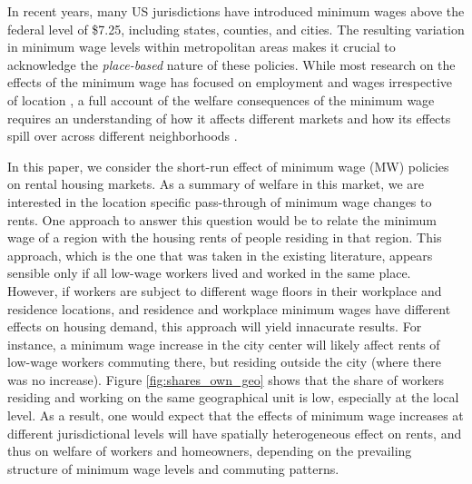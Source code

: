 

In recent years, many US jurisdictions have introduced minimum wages above the 
federal level of \$7.25, including states, counties, and cities.
The resulting variation in minimum wage levels within metropolitan areas makes it 
crucial to acknowledge the \textit{place-based} nature of these policies.
While most research on the effects of the minimum wage has focused on employment 
and wages irrespective of location \parencite[e.g.,][]{AutorEtAl2016,CegnizEtAl2019}, 
a full account of the welfare consequences of the minimum wage requires an 
understanding of how it affects different markets and how its effects spill over 
across different neighborhoods \parencite[as recently emphasized by][]{DubeLindner2021}.

In this paper, we consider the short-run effect of minimum wage (MW) policies on 
rental housing markets.
As a summary of welfare in this market, we are interested in the location specific
pass-through of minimum wage changes to rents.
One approach to answer this question would be to relate the minimum wage of a region
with the housing rents of people residing in that region.
This approach, which is the one that was taken in the existing literature, appears 
sensible only if all low-wage workers lived and worked in the same place.
However, if workers are subject to different wage floors in their workplace and
residence locations, and residence and workplace minimum wages have different 
effects on housing demand, this approach will yield innacurate results.
For instance, a minimum wage increase in the city center will likely affect rents 
of low-wage workers commuting there, but residing outside the city (where there was
no increase).
Figure \ref{fig:shares_own_geo} shows that the share of workers residing and working 
on the same geographical unit is low, especially at the local level.
As a result, one would expect that the effects of minimum wage increases at different 
jurisdictional levels will have spatially heterogeneous effect on rents, and thus 
on welfare of workers and homeowners, depending on the prevailing structure of 
minimum wage levels and commuting patterns.

